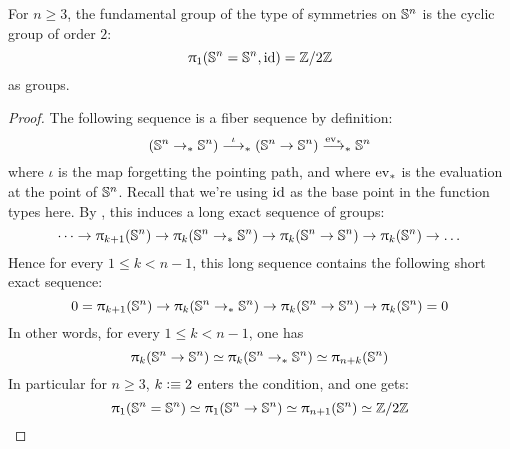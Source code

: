 \documentclass[english,a4paper]{lmcs}
\begin{document}
\begin{thm} \label{thm:fund-grp-of-symmetries}
    For $n \geq 3$, the fundamental group of the type of symmetries on ${\mathbb S^{n}}$ is the cyclic group of order $2$:
    \begin{equation}
    \uppi_{1}({\mathbb S^{n}} = {\mathbb S^{n}}, \mathord{\mathrm{id}}) = \mathbb{Z} \slash 2\mathbb{Z}
    \end{equation}
    as groups.
\end{thm}

\begin{proof}%
  The following sequence is a fiber sequence by definition:
  \begin{displaymath}
    ({\mathbb S^{n}} \to_\ast {\mathbb S^{n}}) \stackrel \iota \longrightarrow_\ast
    ({\mathbb S^{n}} \to {\mathbb S^{n}}) \stackrel {\mathrm{ev}_\ast} \longrightarrow_\ast {\mathbb S^{n}}
  \end{displaymath}
  where $\iota$ is the map forgetting the pointing path, and where $\mathrm{ev}_\ast$
  is the evaluation at the point of ${\mathbb S^{n}}$.
  Recall that we're using $\mathord{\mathrm{id}}$ as the base point in the function types here.
  By \cite[Theorem 8.4.6]{HoTT}, this
  induces a long exact sequence of groups:
  \begin{displaymath}
    \dots \to \uppi_{k+1} ({\mathbb S^{n}})
    \to \uppi_{k}({\mathbb S^{n}} \to_\ast {\mathbb S^{n}}) \to \uppi_{k}({\mathbb S^{n}} \to {\mathbb S^{n}}) \to \uppi_{k}({\mathbb S^{n}})
    \to \dots
  \end{displaymath}
  Hence for every $1\leq k < n-1$, this long sequence contains the following short exact sequence:
  \begin{displaymath}
    0 = \uppi_{k+1}({\mathbb S^{n}})
    \to \uppi_{k}({\mathbb S^{n}} \to_\ast {\mathbb S^{n}}) \to \uppi_{k}({\mathbb S^{n}} \to {\mathbb S^{n}})
    \to \uppi_{k}({\mathbb S^{n}}) = 0
  \end{displaymath}
  In other words, for every $1\leq k < n-1$, one has
  \begin{displaymath}
    \uppi_{k}({\mathbb S^{n}}\to {\mathbb S^{n}}) \simeq \uppi_{k}({\mathbb S^{n}}\to_\ast{\mathbb S^{n}}) \simeq \uppi_{n+k}({\mathbb S^{n}})
  \end{displaymath}
  In particular for $n\geq 3$, $k\vcentcolon\equiv 2$ enters the condition, and one gets:
  \begin{displaymath}
    \uppi_{1} ({\mathbb S^{n}} = {\mathbb S^{n}}) \simeq \uppi_{1} ({\mathbb S^{n}} \to {\mathbb S^{n}}) \simeq \uppi_{n+1} ({\mathbb S^{n}}) \simeq \mathbb{Z} \slash 2\mathbb{Z}\qedhere
  \end{displaymath}
\end{proof}
\end{document}

